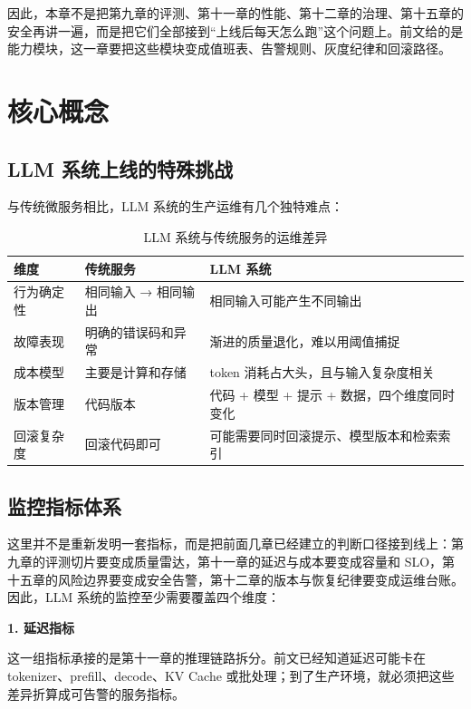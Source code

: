 因此，本章不是把第九章的评测、第十一章的性能、第十二章的治理、第十五章的安全再讲一遍，而是把它们全部接到“上线后每天怎么跑”这个问题上。前文给的是能力模块，这一章要把这些模块变成值班表、告警规则、灰度纪律和回滚路径。

\section{核心概念}

\subsection{LLM 系统上线的特殊挑战}
与传统微服务相比，LLM 系统的生产运维有几个独特难点：

\begin{table}[H]
\centering
\small
\begin{tabularx}{\textwidth}{>{\raggedright\arraybackslash}p{3cm}>{\raggedright\arraybackslash}p{4cm}>{\raggedright\arraybackslash}X}
\toprule
\textbf{维度} & \textbf{传统服务} & \textbf{LLM 系统} \\
\midrule
行为确定性 & 相同输入 → 相同输出 & 相同输入可能产生不同输出 \\
故障表现 & 明确的错误码和异常 & 渐进的质量退化，难以用阈值捕捉 \\
成本模型 & 主要是计算和存储 & token 消耗占大头，且与输入复杂度相关 \\
版本管理 & 代码版本 & 代码 + 模型 + 提示 + 数据，四个维度同时变化 \\
回滚复杂度 & 回滚代码即可 & 可能需要同时回滚提示、模型版本和检索索引 \\
\bottomrule
\end{tabularx}
\caption{LLM 系统与传统服务的运维差异}
\label{tab:llm-vs-traditional-ops}
\end{table}

\subsection{监控指标体系}
这里并不是重新发明一套指标，而是把前面几章已经建立的判断口径接到线上：第九章的评测切片要变成质量雷达，第十一章的延迟与成本要变成容量和 SLO，第十五章的风险边界要变成安全告警，第十二章的版本与恢复纪律要变成运维台账。因此，LLM 系统的监控至少需要覆盖四个维度：

\textbf{1. 延迟指标}

这一组指标承接的是第十一章的推理链路拆分。前文已经知道延迟可能卡在 tokenizer、prefill、decode、KV Cache 或批处理；到了生产环境，就必须把这些差异折算成可告警的服务指标。

